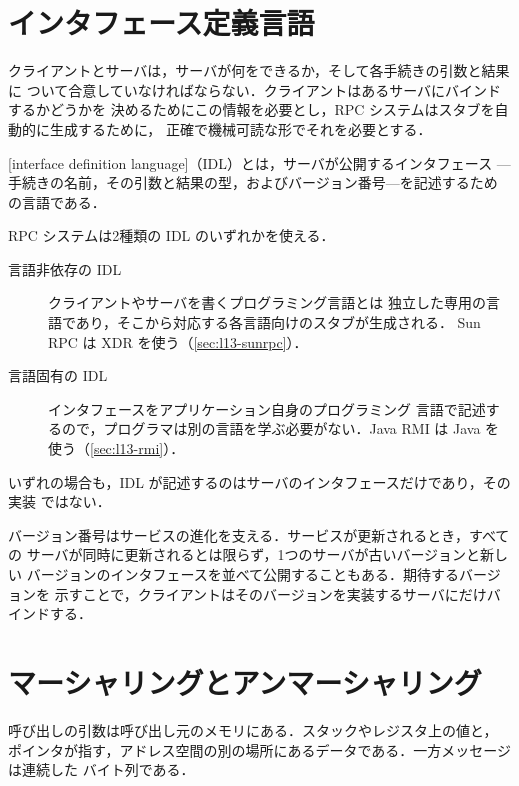\documentclass[../main.tex]{subfiles}
\begin{document}
\section{インタフェース定義言語}
\label{sec:l13-idl}

クライアントとサーバは，サーバが何をできるか，そして各手続きの引数と結果に
ついて合意していなければならない．クライアントはあるサーバにバインドするかどうかを
決めるためにこの情報を必要とし，RPC システムはスタブを自動的に生成するために，
正確で機械可読な形でそれを必要とする．

\begin{definition}[インタフェース定義言語]
  [interface definition language]（IDL）とは，サーバが公開するインタフェース
  ---手続きの名前，その引数と結果の型，およびバージョン番号---を記述するため
  の言語である．
\end{definition}

RPC システムは2種類の IDL のいずれかを使える．
\begin{description}
  \item[言語非依存の IDL] クライアントやサーバを書くプログラミング言語とは
    独立した専用の言語であり，そこから対応する各言語向けのスタブが生成される．
    Sun RPC は XDR を使う（\cref{sec:l13-sunrpc}）．
  \item[言語固有の IDL] インタフェースをアプリケーション自身のプログラミング
    言語で記述するので，プログラマは別の言語を学ぶ必要がない．Java RMI は
    Java を使う（\cref{sec:l13-rmi}）．
\end{description}
いずれの場合も，IDL が記述するのはサーバのインタフェースだけであり，その実装
ではない．

バージョン番号はサービスの進化を支える．サービスが更新されるとき，すべての
サーバが同時に更新されるとは限らず，1つのサーバが古いバージョンと新しい
バージョンのインタフェースを並べて公開することもある．期待するバージョンを
示すことで，クライアントはそのバージョンを実装するサーバにだけバインドする．

\section{マーシャリングとアンマーシャリング}
\label{sec:l13-marshalling}

呼び出しの引数は呼び出し元のメモリにある．スタックやレジスタ上の値と，
ポインタが指す，アドレス空間の別の場所にあるデータである．一方メッセージは連続した
バイト列である．
\end{document}
